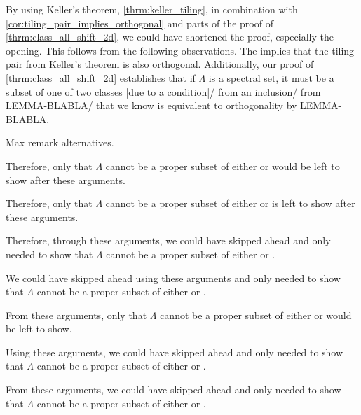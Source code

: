 \documentclass[../thesis.tex]{subfiles}
\begin{document}
\begin{remark}
    By using Keller's theorem, \cref{thrm:keller_tiling}, in combination with \cref{cor:tiling_pair_implies_orthogonal} and parts of the proof of \cref{thrm:class_all_shift_2d}, we could have shortened the proof, especially the opening. This follows from the following observations. The  implies that the tiling pair from Keller's theorem is also orthogonal. Additionally, our proof of \cref{thrm:class_all_shift_2d} establishes that if $\Lambda$ is a spectral set, it must be a subset of one of two classes |due to a condition|/ from an inclusion/ from LEMMA-BLABLA/  that we know is equivalent to orthogonality by LEMMA-BLABLA. 
\end{remark}



Max remark alternatives. 

Therefore, only that $\Lambda$ cannot be a proper subset of either  or  would be left to show after these arguments. 

Therefore, only that $\Lambda$ cannot be a proper subset of either  or  is left to show after these arguments. 

Therefore, through these arguments, we could have skipped ahead and only needed to show that $\Lambda$ cannot be a proper subset of either  or .

We could have skipped ahead using these arguments and only needed to show that $\Lambda$ cannot be a proper subset of either  or .

From these arguments, only that $\Lambda$ cannot be a proper subset of either  or  would be left to show.

Using these arguments, we could have skipped ahead and only needed to show that $\Lambda$ cannot be a proper subset of either  or .


From these arguments, we could have skipped ahead and only needed to show that $\Lambda$ cannot be a proper subset of either  or .
\end{document}
